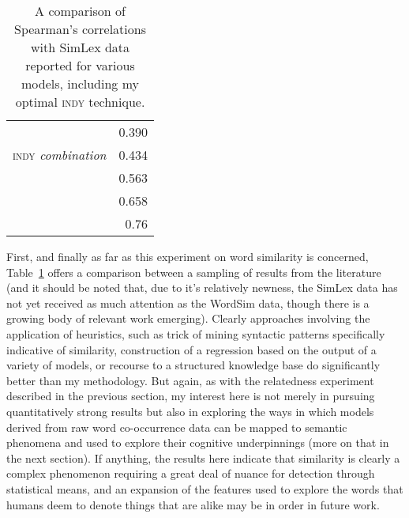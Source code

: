 \begin{table}
\centering
\begin{tabular}{lr}
\hline
\cite{MaEA2017} & 0.390 \\
\textsc{indy} \emph{combination} & 0.434 \\
\cite{SchwartzEA2015} & 0.563 \\
\cite{BanjadeEA2015} & 0.658 \\
\cite{RecskiEA2016} & 0.76 \\
\hline
\end{tabular}
\caption[Comparison of Similarity Scores]{A comparison of Spearman's correlations with SimLex data reported for various models, including my optimal \textsc{indy} technique.}
\label{tab:simpare}
\end{table}

First, and finally as far as this experiment on word similarity is concerned, Table~\ref{tab:simpare} offers a comparison between a sampling of results from the literature (and it should be noted that, due to it's relatively newness, the SimLex data has not yet received as much attention as the WordSim data, though there is a growing body of relevant work emerging).  Clearly approaches involving the application of heuristics, such as  trick of mining syntactic patterns specifically indicative of similarity,  construction of a regression based on the output of a variety of models, or  recourse to a structured knowledge base do significantly better than my methodology.  But again, as with the relatedness experiment described in the previous section, my interest here is not merely in pursuing quantitatively strong results but also in exploring the ways in which models derived from raw word co-occurrence data can be mapped to semantic phenomena and used to explore their cognitive underpinnings (more on that in the next section).  If anything, the results here indicate that similarity is clearly a complex phenomenon requiring a great deal of nuance for detection through statistical means, and an expansion of the features used to explore the words that humans deem to denote things that are alike may be in order in future work.

